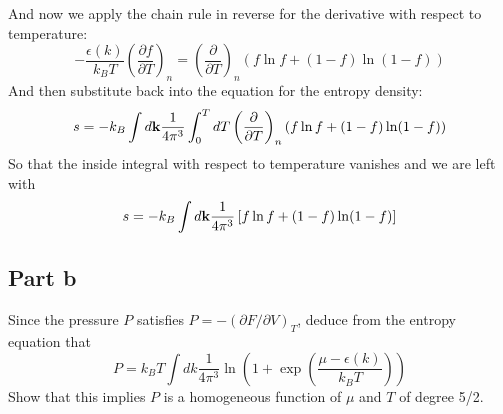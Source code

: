 \documentclass[12pt]{article}
\begin{document}
And now we apply the chain rule in reverse for the derivative with respect to temperature:
\begin{equation}
    -\frac{\epsilon (k)}{k_B T} \left( \frac{\partial f}{\partial T} \right)_n = \left( \frac{\partial}{\partial T} \right)_n \left( f \ln f + (1 - f) \ln (1 - f) \right)
\end{equation}
And then substitute back into the equation for the entropy density:
\begin{equation}
    s = -k_B \int d\vb{k} \frac{1}{4\pi^3} \int_{0}^{T} dT \left( \frac{\partial}{\partial T} \right)_n \left( f \ln f + (1 - f) \ln (1 - f) \right)
\end{equation}
So that the inside integral with respect to temperature vanishes and we are left with
\begin{equation}
    s = -k_B \int d\vb{k} \frac{1}{4\pi^3} \left[ f \ln f + (1 - f) \ln (1 - f) \right]
\end{equation}

\subsection{Part b}
Since the pressure $P$ satisfies $P = -(\partial F / \partial V)_T$, deduce from the entropy equation that
\[
P = k_B T \int dk \frac{1}{4\pi^3} \ln \left( 1 + \exp \left( \frac{\mu - \epsilon(k)}{k_B T} \right) \right)
\]
Show that this implies $P$ is a homogeneous function of $\mu$ and $T$ of degree 5/2.
\end{document}
